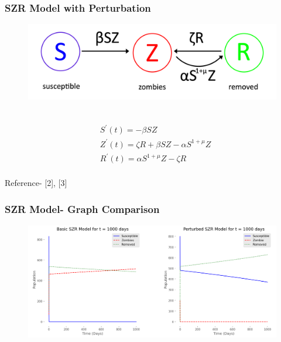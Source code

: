 \documentclass{beamer}
\begin{document}
\begin{frame}
\frametitle{SZR Model with Perturbation}

\begin{figure}[H]
\centering
\includegraphics[scale=1.0]{SZR_mu.png}
\label{fig:Perturbed SZR Model}
\end{figure}
~\\
\begin{equation*}
\begin{aligned}
&S^{\prime}(t)=-\beta SZ \\
&Z^{\prime}(t)=\zeta R + \beta SZ - \alpha S^{1 + \mu} Z\\
&R^{\prime}(t)=\alpha S^{1 + \mu} Z - \zeta R \\
\end{aligned}
\end{equation*}

\tiny{Reference- [2], [3]}
\end{frame}



\begin{frame}
\begin{adjustwidth}{-1.5em}{-1.5em}
\frametitle{SZR Model- Graph Comparison}

\begin{figure}[H]
\centering
\includegraphics[scale=0.18]{SZRModel.png}
\label{fig:SZR Model 01}
\end{figure}
\end{adjustwidth}
\end{frame}
\end{document}
